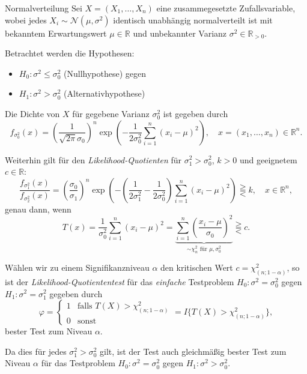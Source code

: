 \begin{example}{Normalverteilung}
    Sei $X = (X_1, \ldots, X_n)$ eine zusammegesetzte Zufallsvariable, wobei jedes $X_i \sim \mathcal{N}(\mu, \sigma^2)$ identisch unabhängig normalverteilt ist mit bekanntem Erwartungswert $\mu \in \mathbb{R}$ und unbekannter Varianz $\sigma^2 \in \mathbb{R}_{> 0}$.

    Betrachtet werden die Hypothesen:
    \begin{itemize}
        \item $H_0: \sigma^2 \leq \sigma_0^2$ (Nullhypothese) gegen
        \item $H_1: \sigma^2 > \sigma_0^2$ (Alternativhypothese)
    \end{itemize}

    Die Dichte von $X$ für gegebene Varianz $\sigma_0^2$ ist gegeben durch
    \[
        f_{\sigma_0^2}(x) = \left( \frac{1}{\sqrt{2 \pi} \sigma_0} \right)^n \exp \left( -\frac{1}{2 \sigma_0^2} \sum_{i = 1}^{n} (x_i - \mu)^2 \right), \quad x = (x_1, \ldots, x_n) \in \mathbb{R}^n.
    \]

    Weiterhin gilt für den \emph{Likelihood-Quotienten} für $\sigma_1^2 > \sigma_0^2$, $k > 0$ und geeignetem $c \in \mathbb{R}$:
    \[
        \frac{f_{\sigma_1^2}(x)}{f_{\sigma_2^2}(x)} = \left( \frac{\sigma_0}{\sigma_1} \right)^n \exp \left( -\left( \frac{1}{2 \sigma_1^2} - \frac{1}{2 \sigma_0^2} \right) \sum_{i = 1}^{n} (x_i - \mu)^2 \right) \gtreqqless k, \quad x \in \mathbb{R}^n,
    \]
    genau dann, wenn
    \[
        T(x) = \frac{1}{\sigma_0^2} \sum_{i = 1}^{n} (x_i - \mu)^2 = \underbrace{\sum_{i = 1}^{n} \left( \frac{x_i - \mu}{\sigma_0} \right)^2}_{\sim \chi^2_n \text{ für } \mu, \sigma_0^2} \gtreqqless c.
    \]

    Wählen wir zu einem Signifikanzniveau $\alpha$ den kritischen Wert $c = \chi^2_{(n; 1 - \alpha)}$, so ist der \emph{Likelihood-Quotiententest} für das \textit{einfache} Testproblem $H_0: \sigma^2 = \sigma_0^2$ gegen $H_1: \sigma^2 = \sigma_1^2$ gegeben durch
    \[
        \varphi = \begin{cases}
            1 & \text{falls } T(X) > \chi^2_{(n; 1 - \alpha)} \\
            0 & \text{sonst}
        \end{cases}
        = I \{ T(X) > \chi^2_{(n; 1 - \alpha)} \},
    \]
    bester Test zum Niveau $\alpha$.

    Da dies für jedes $\sigma_1^2 > \sigma_0^2$ gilt, ist der Test auch gleichmäßig bester Test zum Niveau $\alpha$ für das Testproblem $H_0: \sigma^2 = \sigma_0^2$ gegen $H_1: \sigma^2 > \sigma_0^2$.


\end{example}

